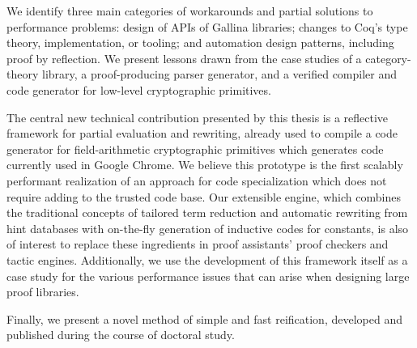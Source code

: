 We identify three main categories of workarounds and partial solutions to performance problems: design of APIs of Gallina libraries; changes to Coq's type theory, implementation, or tooling; and automation design patterns, including proof by reflection.
We present lessons drawn from the case studies of a category-theory library, a proof-producing parser generator, and a verified compiler and code generator for low-level cryptographic primitives.

The central new technical contribution presented by this thesis is a reflective framework for partial evaluation and rewriting, already used to compile a code generator for field-arithmetic cryptographic primitives which generates code currently used in Google Chrome.
We believe this prototype is the first scalably performant realization of an approach for code specialization which does not require adding to the trusted code base.
Our extensible engine, which combines the traditional concepts of tailored term reduction and automatic rewriting from hint databases with on-the-fly generation of inductive codes for constants, is also of interest to replace these ingredients in proof assistants' proof checkers and tactic engines.
Additionally, we use the development of this framework itself as a case study for the various performance issues that can arise when designing large proof libraries.

Finally, we present a novel method of simple and fast reification, developed and published during the course of doctoral study.
